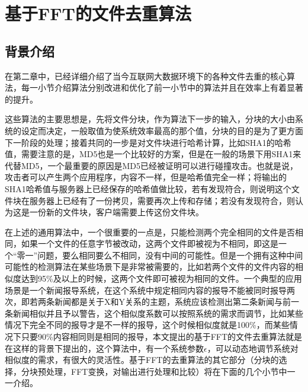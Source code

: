


\chapter{基于FFT的文件去重算法}
\label{chap:algo}

\section{背景介绍}
\label{sec:back}

在第二章中，已经详细介绍了当今互联网大数据环境下的各种文件去重的核心算法，每一小节介绍算法分别改进和优化了前一小节中的算法并且在效率上有着显著的提升。

这些算法的主要思想是，先将文件分块，作为算法下一步的输入，分块的大小由系统的设定而决定，一般取值为使系统效率最高的那个值，分块的目的是为了更方面下一阶段的处理；接着共同的一步是对文件块进行哈希计算，比如SHA1的哈希值，需要注意的是，MD5也是一个比较好的方案，但是在一般的场景下用SHA1来代替MD5，一个最重要的原因是MD5已经被证明可以进行碰撞攻击。也就是说，攻击者可以产生两个应用程序，内容不一样，但是哈希值完全一样；将输出的SHA1哈希值与服务器上已经保存的哈希值做比较，若有发现符合，则说明这个文件块在服务器上已经有了一份拷贝，需要再次上传和存储；若没有发现符合，则认为这是一份新的文件块，客户端需要上传这份文件块。

在上述的通用算法中，一个很重要的一点是，只能检测两个完全相同的文件是否相同，如果一个文件的任意字节被改动，这两个文件即被视为不相同，即这是一个“零一”问题，要么相同要么不相同，没有中间的可能性。但是一个拥有这种中间可能性的检测算法在某些场景下是非常被需要的，比如若两个文件的文件内容的相似度达到95\%及以上的时候，这两个文件即可被视为相同的文件。一个典型的应用场景是一个新闻报导系统，在这个系统中规定相同内容的报导不能被同时报导两次，即若两条新闻都是关于X和Y关系的主题，系统应该检测出第二条新闻与前一条新闻相似并且予以警告，这个相似度系数可以按照系统的需求而调节，比如某些情况下完全不同的报导才是不一样的报导，这个时候相似度就是100\%，而某些情况下只要90\%内容相同则是相同的报导，本文提出的基于FFT的文件去重算法就是在这样的背景下提出的，这个算法中，有一个系统参数$\epsilon$，可以动态地调节系统对相似度的需求，有很大的灵活性。基于FFT的去重算法的其它部分（分块的选择，分块预处理，FFT变换，对输出进行处理和比较）将在下面的几个小节中一一介绍。

